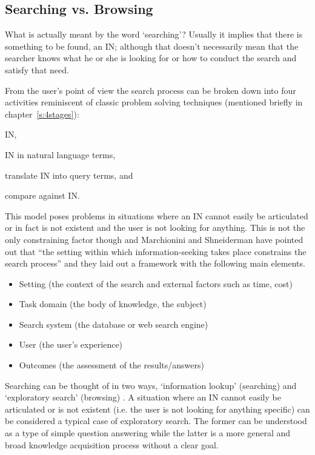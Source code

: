 \subsection{Searching vs. Browsing}
\label{s:browsing}

What is actually meant by the word `searching'? Usually it implies that there is something to be found, an \ac{IN}; although that doesn't necessarily mean that the searcher knows what he or she is looking for or how to conduct the search and satisfy that need.

From the user's point of view the search process can be broken down into four activities \autocite{Sutcliffe1998} reminiscent of classic problem solving techniques (mentioned briefly in chapter~\ref{s:4stages})\autocite{Polya1957}:

\begin{description}[leftmargin=5cm]
  \item [Problem identification] \acf{IN},
  \item [Need articulation] \ac{IN} in natural language terms,
  \item [Query formulation] translate \ac{IN} into query terms, and
  \item [Results evaluation] compare against \ac{IN}.
\end{description}

This model poses problems in situations where an \ac{IN} cannot easily be articulated or in fact is not existent and the user is not looking for anything. This is not the only constraining factor though and Marchionini and Shneiderman have pointed out that ``the setting within which information-seeking takes place constrains the search process'' \citeyear{Marchionini1988} and they laid out a framework with the following main elements.

\begin{itemize}
  \item Setting (the context of the search and external factors such as time, cost)
  \item Task domain (the body of knowledge, the subject)
  \item Search system (the database or web search engine)
  \item User (the user’s experience)
  \item Outcomes (the assessment of the results/answers)
\end{itemize}

Searching can be thought of in two ways, `information lookup' (searching) and `exploratory search' (browsing) \autocite{DeVries1993, Marchionini2006}. A situation where an \ac{IN} cannot easily be articulated or is not existent (i.e. the user is not looking for anything specific) can be considered a typical case of exploratory search. The former can be understood as a type of simple question answering while the latter is a more general and broad knowledge acquisition process without a clear goal.

